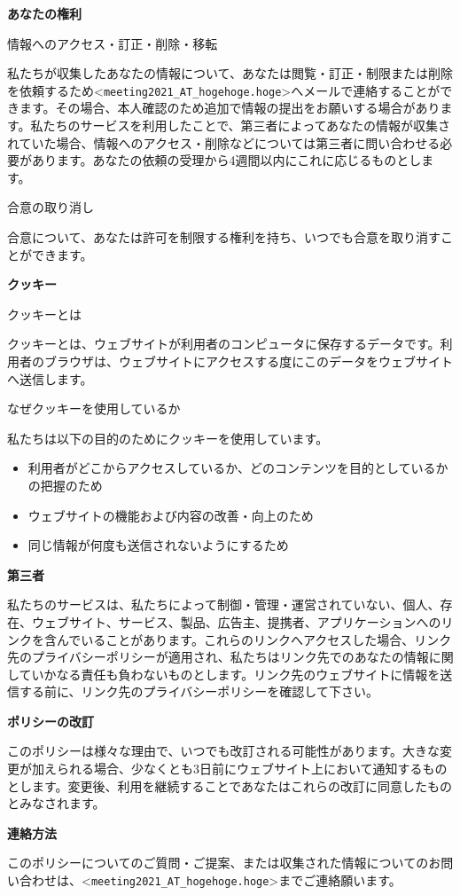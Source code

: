 \documentclass[titlepage,10pt,a4paper,uplatex]{jsbook}
\newenvironment{content}{\begin{shaded}\vspace{-1em}\raggedright\ttfamily\footnotesize\setlength{\baselineskip}{1.4em}}{\end{shaded}\vspace{-1em}}
\renewcommand{\textbf}[1]{{\bfseries\sffamily#1}}
\begin{document}
\begin{content}
\textbf{\Large あなたの権利}

{\Large 情報へのアクセス・訂正・削除・移転}

私たちが収集したあなたの情報について、あなたは閲覧・訂正・制限または削除を依頼するため{\textless}\texttt{meeting2021\_AT\_hogehoge.hoge}{\textgreater}へメールで連絡することができます。その場合、本人確認のため追加で情報の提出をお願いする場合があります。私たちのサービスを利用したことで、第三者によってあなたの情報が収集されていた場合、情報へのアクセス・削除などについては第三者に問い合わせる必要があります。あなたの依頼の受理から4週間以内にこれに応じるものとします。

{\Large 合意の取り消し}

合意について、あなたは許可を制限する権利を持ち、いつでも合意を取り消すことができます。

\textbf{\Large クッキー}

{\Large クッキーとは}

クッキーとは、ウェブサイトが利用者のコンピュータに保存するデータです。利用者のブラウザは、ウェブサイトにアクセスする度にこのデータをウェブサイトへ送信します。

{\Large なぜクッキーを使用しているか}

私たちは以下の目的のためにクッキーを使用しています。

\begin{itemize}
\item 利用者がどこからアクセスしているか、どのコンテンツを目的としているかの把握のため
\item ウェブサイトの機能および内容の改善・向上のため
\item 同じ情報が何度も送信されないようにするため
\end{itemize}

\textbf{\Large 第三者}

私たちのサービスは、私たちによって制御・管理・運営されていない、個人、存在、ウェブサイト、サービス、製品、広告主、提携者、アプリケーションへのリンクを含んでいることがあります。これらのリンクへアクセスした場合、リンク先のプライバシーポリシーが適用され、私たちはリンク先でのあなたの情報に関していかなる責任も負わないものとします。リンク先のウェブサイトに情報を送信する前に、リンク先のプライバシーポリシーを確認して下さい。

\textbf{\Large ポリシーの改訂}

このポリシーは様々な理由で、いつでも改訂される可能性があります。大きな変更が加えられる場合、少なくとも3日前にウェブサイト上において通知するものとします。変更後、利用を継続することであなたはこれらの改訂に同意したものとみなされます。

\textbf{\Large 連絡方法}

このポリシーについてのご質問・ご提案、または収集された情報についてのお問い合わせは、{\textless}\texttt{meeting2021\_AT\_hogehoge.hoge}{\textgreater}までご連絡願います。
\end{content}
\end{document}
